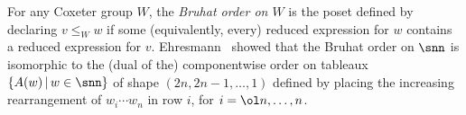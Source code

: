 
For any Coxeter group $W$,
the {\em Bruhat order on $W$} is the poset
defined by declaring $v \leq_W w$ 
if
some (equivalently, every)
reduced expression for $w$ contains a reduced expression for $v$.
Ehresmann~\cite{Ehresmann}
showed that the Bruhat order on $\snn$ is isomorphic
to the (dual of the)
componentwise order on tableaux $\{ A(w) \,|\, w \in \snn \}$
of shape $(2n,2n-1,\dotsc,1)$ defined by placing the
increasing rearrangement of $w_i \cdots w_n$ in row $i$,
for $i = \ol n, \dotsc, n$.
